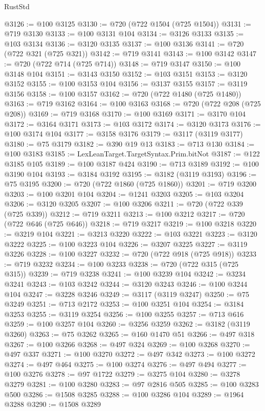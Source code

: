\begin{lexlean}{RustStd}
\begin{coremodule}
@3126 := @100 @3125
@3130 := @720 (@722 @1504 (@725 @1504))
@3131 := @719 @3130
@3133 := @100 @3131 @104
@3134 := @3126 @3133
@3135 := @103 @3134
@3136 := @3120 @3135
@3137 := @100 @3136
@3141 := @720 (@722 @321 (@725 @321))
@3142 := @719 @3141
@3143 := @100 @3142
@3147 := @720 (@722 @714 (@725 @714))
@3148 := @719 @3147
@3150 := @100 @3148 @104
@3151 := @3143 @3150
@3152 := @103 @3151
@3153 := @3120 @3152
@3155 := @100 @3153 @104
@3156 := @3137 @3155
@3157 := @3119 @3156
@3158 := @100 @3157
@3162 := @720 (@722 @1480 (@725 @1480))
@3163 := @719 @3162
@3164 := @100 @3163
@3168 := @720 (@722 @208 (@725 @208))
@3169 := @719 @3168
@3170 := @100 @3169
@3171 := @3170 @104
@3172 := @3164 @3171
@3173 := @103 @3172
@3174 := @3120 @3173
@3176 := @100 @3174 @104
@3177 := @3158 @3176
@3179 := @3117 (@3119 @3177)
@3180 := @75 @3179
@3182 := @390 @19 @13
@3183 := @713 @130
@3184 := @100 @3183
@3185 := LexLeanTarget.TargetSyntax.Prim.bitNot
@3187 := @122 @3185 @105
@3189 := @100 @3187 @424
@3190 := @713 @3189
@3192 := @100 @3190 @104
@3193 := @3184 @3192
@3195 := @3182 (@3119 @3193)
@3196 := @75 @3195
@3200 := @720 (@722 @1860 (@725 @1860))
@3201 := @719 @3200
@3203 := @100 @3201 @104
@3204 := @1241 @3203
@3205 := @103 @3204
@3206 := @3120 @3205
@3207 := @100 @3206
@3211 := @720 (@722 @339 (@725 @339))
@3212 := @719 @3211
@3213 := @100 @3212
@3217 := @720 (@722 @646 (@725 @646))
@3218 := @719 @3217
@3219 := @100 @3218
@3220 := @3219 @104
@3221 := @3213 @3220
@3222 := @103 @3221
@3223 := @3120 @3222
@3225 := @100 @3223 @104
@3226 := @3207 @3225
@3227 := @3119 @3226
@3228 := @100 @3227
@3232 := @720 (@722 @918 (@725 @918))
@3233 := @719 @3232
@3234 := @100 @3233
@3238 := @720 (@722 @315 (@725 @315))
@3239 := @719 @3238
@3241 := @100 @3239 @104
@3242 := @3234 @3241
@3243 := @103 @3242
@3244 := @3120 @3243
@3246 := @100 @3244 @104
@3247 := @3228 @3246
@3249 := @3117 (@3119 @3247)
@3250 := @75 @3249
@3251 := @713 @2172
@3253 := @100 @3251 @104
@3254 := @3184 @3253
@3255 := @3119 @3254
@3256 := @100 @3255
@3257 := @713 @616
@3259 := @100 @3257 @104
@3260 := @3256 @3259
@3262 := @3182 (@3119 @3260)
@3263 := @75 @3262
@3265 := @160 @1470 @51
@3266 := @497 @318
@3267 := @100 @3266
@3268 := @497 @324
@3269 := @100 @3268
@3270 := @497 @337
@3271 := @100 @3270
@3272 := @497 @342
@3273 := @100 @3272
@3274 := @497 @464
@3275 := @100 @3274
@3276 := @497 @494
@3277 := @100 @3276
@3278 := @97 @1722
@3279 := @3275 @104
@3280 := @3278 @3279
@3281 := @100 @3280
@3283 := @97 @2816 @505
@3285 := @100 @3283 @500
@3286 := @1508 @3285
@3288 := @100 @3286 @104
@3289 := @1964 @3288
@3290 := @1508 @3289

\end{coremodule}
\end{lexlean}
